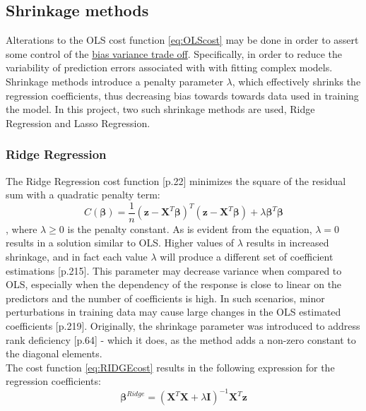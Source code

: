 \documentclass[%
oneside,                 %
final,                   %
10pt]{article}
\begin{document}
\subsection{Shrinkage methods}
Alterations to the OLS cost function \eqref{eq:OLScost} may be done in order to assert some control of the  \hyperref[S:M_Biasvar]{bias variance trade off}. Specifically, in order to reduce the variability of prediction errors associated with with fitting complex models. Shrinkage methods introduce a penalty parameter $\lambda$, which effectively shrinks the regression coefficients, thus decreasing bias towards towards data used in training the model. In this project, two such shrinkage methods are used, Ridge Regression and Lasso Regression. 


\subsubsection{Ridge Regression}
The Ridge Regression cost function \citep{MehtaPankaj2019Ahli}[p.22] minimizes the square of the residual sum with a quadratic penalty term:
\begin{equation}
C(\bm{\beta})=\frac{1}{n}(\bm{z}-\bm{X}^T\bm{\beta})^T(\bm{z}-\bm{X}^T\bm{\beta})+\lambda \bm{\beta}^T\bm{\beta}
\label{eq:RIDGEcost}
\end{equation}
, where $ \lambda \geq 0$ is the penalty constant. As is evident from the equation, $\lambda=0$ results in a solution similar to OLS. Higher values of $\lambda$ results in increased shrinkage, and in fact each value $\lambda$ will produce a different set of coefficient estimations \citep{2017introstatlearn}[p.215]. This parameter may decrease variance when compared to OLS, especially when the dependency of the response is close to linear on the predictors and the number of coefficients is high. In such scenarios, minor perturbations in training data may cause large changes in the OLS estimated coefficients \citep{2017introstatlearn}[p.219].
 Originally, the shrinkage parameter was introduced to address rank deficiency \citep{HastieTrevor2009TEoS}[p.64] - which it does, as the method adds a non-zero constant to the diagonal elements. \\
The cost function \eqref{eq:RIDGEcost} results in the following expression for the regression coefficients:
\begin{equation}
\bm{\beta}^{Ridge}=(\bm{X}^T\bm{X}+\lambda\bm{I})^{-1}\bm{X}^T\bm{z}
\end{equation}
\end{document}
